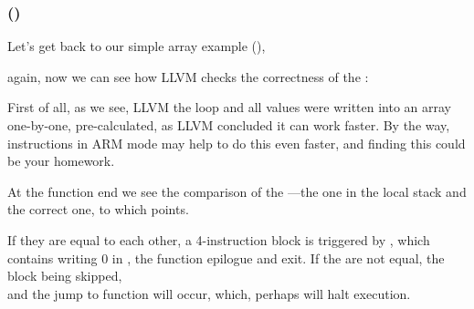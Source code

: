 \subsubsection{\OptimizingXcodeIV (\ThumbTwoMode)}


Let's get back to our simple array example (),

again, now we can see how LLVM checks the correctness of the :




First of all, as we see, LLVM  the loop and all values were written into an array one-by-one,
pre-calculated, as LLVM concluded it can work faster.
By the way, instructions in ARM mode may help to do this even faster, 
and finding this could be your homework.


At the function end we see the comparison of the ---the one in the local stack and the correct one,
to which  points.

If they are equal to each other, a 4-instruction block is triggered by ,
which contains writing 0 in , the function epilogue and exit.
If the  are not equal, the block being skipped,\\
and the jump to 
 function will occur, which, perhaps will halt execution.
